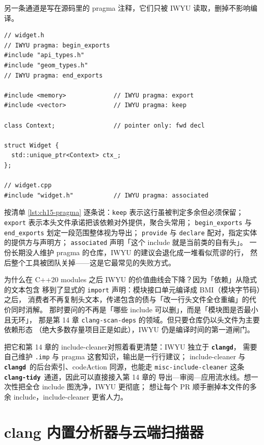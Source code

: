 \documentclass[12pt,a4paper,fontset=fandol]{ctexbook}
\newcommand{\cpp}[1]{C++#1}
\newcommand{\Bk}{\discretionary{}{}{}}
\newcommand{\Lib}[1]{\textbf{\texttt{#1}}}
\newcommand{\Tidy}{\Lib{clang-tidy}}
\newcommand{\CD}{\Lib{clangd}}
\begin{document}
另一条通道是写在源码里的 pragma 注释，它们只被 IWYU 读取，删掉不影响编译。

\begin{lstlisting}[style=cppstyle,caption={头文件与实现文件里的 IWYU pragma 注释},label={lst:ch15-pragma}]
// widget.h
// IWYU pragma: begin_exports
#include "api_types.h"
#include "geom_types.h"
// IWYU pragma: end_exports

#include <memory>             // IWYU pragma: export
#include <vector>             // IWYU pragma: keep

class Context;                // pointer only: fwd decl

struct Widget {
  std::unique_ptr<Context> ctx_;
};

// widget.cpp
#include "widget.h"           // IWYU pragma: associated
\end{lstlisting}

按清单 \ref{lst:ch15-pragma} 逐条说：\texttt{keep} 表示这行虽被判定多余但必须保留；
\texttt{export} 表示本头文件承诺把该依赖对外提供，聚合头常用；
\texttt{begin\_exports} 与 \texttt{end\_exports} 划定一段范围整体视为导出；
\texttt{provide} 与 \texttt{declare} 配对，指定实体的提供方与声明方；
\texttt{associated} 声明「这个 include 就是当前类的自有头」。
一份长期没人维护 pragma 的仓库，IWYU 的建议会退化成一堆看似荒谬的行，
然后整个工具被团队关掉——这是它最常见的失败方式。

为什么在 \cpp{20} modules 之后 IWYU 的价值曲线会下降？因为「依赖」从隐式的文本包含
移到了显式的 \texttt{import} 声明：模块接口单元编译成 BMI（模块字节码）之后，
消费者不再复制头文本，传递包含的债与「改一行头文件全仓重编」的代价同时消解。
那时要问的不再是「哪些 include 可以删」，而是「模块图是否最小且无环」，
那是第 14 章 \texttt{clang-scan-deps} 的领域。但只要仓库仍以头文件为主要依赖形态
（绝大多数存量项目正是如此），IWYU 仍是编译时间的第一道闸门。

把它和第 14 章的 \Bk include-cleaner\Bk 对照着看更清楚：IWYU 独立于 \CD{}，
需要自己维护 \texttt{.imp} 与 pragma 这套知识，输出是一行行建议；
include-cleaner 与 \CD\ 的后台索引、codeAction 同源，也能走
\texttt{misc-include-cleaner} 这条 \Tidy\ 通道，因此可以直接接入第 14 章的
导出—审阅—应用流水线。想一次性把全仓 include 图洗净，IWYU 更彻底；
想让每个 PR 顺手删掉本文件的多余 include，include-cleaner 更省人力。

\section{clang 内置分析器与云端扫描器}\label{sec:ch15-s4}
\end{document}
